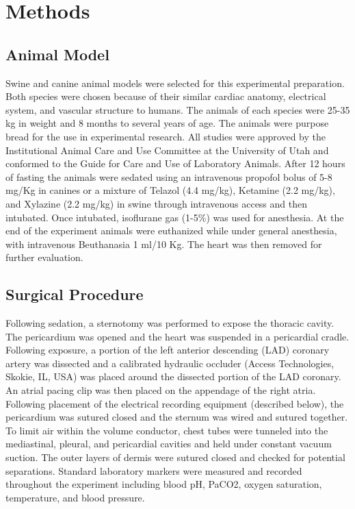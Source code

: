 \documentclass[twocolumn]{cinc}
\begin{document}
%


\section{Methods}

\subsection{Animal Model} 

Swine and canine animal models were selected for this experimental preparation. Both species were chosen because of their similar cardiac anatomy, electrical system, and vascular structure to humans. The animals of each species were 25-35 kg in weight and 8 months to several years of age. The animals were purpose bread for the use in experimental research. All studies were approved by the Institutional Animal Care and Use Committee at the University of Utah and conformed to the Guide for Care and Use of Laboratory Animals. After 12 hours of fasting the animals were sedated using an intravenous propofol bolus of 5-8 mg/Kg in canines or a mixture of Telazol (4.4 mg/kg), Ketamine (2.2 mg/kg), and Xylazine (2.2 mg/kg) in swine through intravenous access and then intubated. Once intubated, isoflurane gas (1-5\%) was used for anesthesia. At the end of the experiment animals were euthanized while under general anesthesia, with intravenous Beuthanasia 1 ml/10 Kg. The heart was then removed for further evaluation.

\subsection{Surgical Procedure}

Following sedation, a sternotomy was performed to expose the thoracic cavity. The pericardium was opened and the heart was suspended in a pericardial cradle. Following exposure, a portion of the left anterior descending (LAD) coronary artery was dissected and a calibrated hydraulic occluder (Access Technologies, Skokie, IL, USA) was placed around the dissected portion of the LAD coronary. An atrial pacing clip was then placed on the appendage of the right atria. Following placement of the electrical recording equipment (described below), the pericardium was sutured closed and the sternum was wired and sutured together. To limit air within the volume conductor, chest tubes were tunneled into the mediastinal, pleural, and pericardial cavities and held under constant vacuum suction. The outer layers of dermis were sutured closed and checked for potential separations. Standard laboratory markers were measured and recorded throughout the experiment including blood pH, PaCO2, oxygen saturation, temperature, and blood pressure.  
\end{document}
